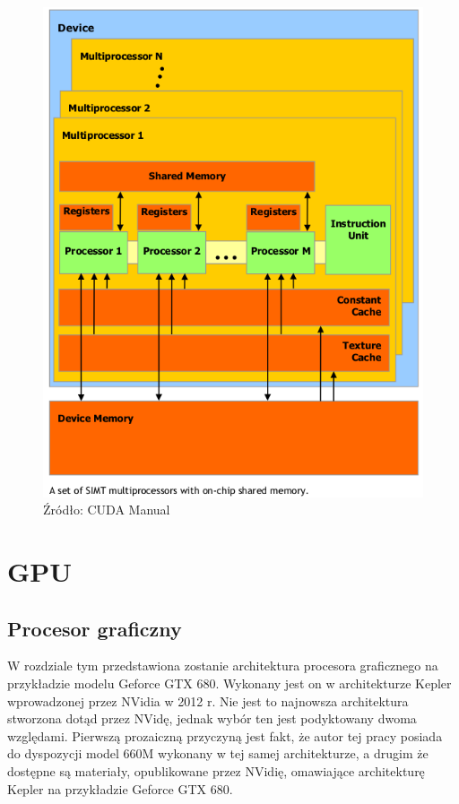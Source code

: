 \begin{figure}[H]
\centering
\includegraphics[scale=0.6]{images/gpu.png}
\caption{Źródło: CUDA Manual}
\end{figure}

\section{GPU}
\subsection{Procesor graficzny}
W rozdziale tym przedstawiona zostanie architektura procesora graficznego na
przykładzie modelu Geforce GTX 680. Wykonany jest on w architekturze Kepler
wprowadzonej przez NVidia w 2012 r. Nie jest to najnowsza architektura stworzona
dotąd przez NVidę, jednak wybór ten jest podyktowany dwoma
względami. Pierwszą prozaiczną przyczyną jest fakt, że autor tej pracy posiada
do dyspozycji model 660M wykonany w tej samej architekturze, a drugim że
dostępne są materiały, opublikowane przez NVidię, omawiające architekturę Kepler
na przykładzie Geforce GTX 680.


